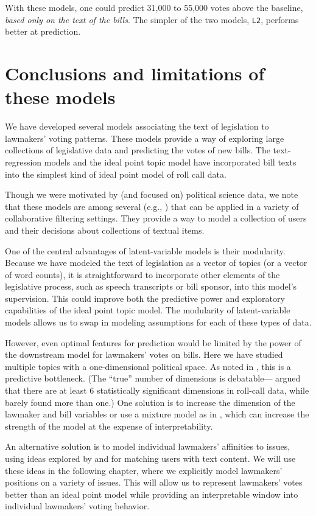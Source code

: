 With these models, one could predict 31,000 to 55,000 votes
above the baseline, \emph{based only on the text of the bills}.  The
simpler of the two models, \verb!L2!, performs better at prediction.

\section{Conclusions and limitations of these models}

We have developed several models associating the text of legislation
to lawmakers' voting patterns.  These models provide a way of
exploring large collections of legislative data and predicting the
votes of new bills.  The text-regression models and the ideal point
topic model have incorporated bill texts into the simplest kind of
ideal point model of roll call data. 

Though we were motivated by (and focused on) political science data,
we note that these models are among several (e.g.,
\cite{agarwal:2010}) that can be applied in a variety of collaborative
filtering settings.  They provide a way to model a collection of users
and their decisions about collections of textual items.

One of the central advantages of latent-variable models is their
modularity.  Because we have modeled the text of legislation as a
vector of topics (or a vector of word counts), it is straightforward
to incorporate other elements of the legislative process, such as
speech transcripts \citep{quinn:2006,thomas:2006} or bill sponsor, into
this model's supervision.  This could improve both the predictive
power and exploratory capabilities of the ideal point topic model.
The modularity of latent-variable models allows us to swap in modeling
assumptions for each of these types of data.
 
However, even optimal features for prediction would be limited by the
power of the downstream model for lawmakers' votes on bills.  Here we
have studied multiple topics with a one-dimensional political space.
As noted in , this is a predictive bottleneck. (The
``true'' number of dimensions is debatable---\cite{heckman:1996}
argued that there are at least 6 statistically significant dimensions
in roll-call data, while \cite{jackman:2001} barely found more than
one.)  One solution is to increase the dimension of the lawmaker and
bill variables or use a mixture model as in \citet{wang:2010}, which
can increase the strength of the model at the expense of
interpretability.

An alternative solution is to model individual lawmakers' affinities
to issues, using ideas explored by \cite{agarwal:2010} and
\cite{wang:2011} for matching users with text content.  We will use
these ideas in the following chapter, where we explicitly model
lawmakers' positions on a variety of issues.  This will allow us to
represent lawmakers' votes better than an ideal point model while
providing an interpretable window into individual lawmakers' voting
behavior.
